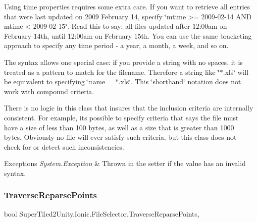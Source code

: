 Using time properties requires some extra care. If you want to retrieve all entries that were last updated on 2009 February 14, specify \char`\"{}mtime >= 2009-\/02-\/14 A\+N\+D mtime < 2009-\/02-\/15\char`\"{}. Read this to say\+: all files updated after 12\+:00am on February 14th, until 12\+:00am on February 15th. You can use the same bracketing approach to specify any time period -\/ a year, a month, a week, and so on. 

The syntax allows one special case\+: if you provide a string with no spaces, it is treated as a pattern to match for the filename. Therefore a string like \char`\"{}$\ast$.\+xls\char`\"{} will be equivalent to specifying \char`\"{}name
  = $\ast$.\+xls\char`\"{}. This \char`\"{}shorthand\char`\"{} notation does not work with compound criteria. 

There is no logic in this class that insures that the inclusion criteria are internally consistent. For example, it\textquotesingle{}s possible to specify criteria that says the file must have a size of less than 100 bytes, as well as a size that is greater than 1000 bytes. Obviously no file will ever satisfy such criteria, but this class does not check for or detect such inconsistencies. 


\begin{DoxyExceptions}{Exceptions}
{\em System.\+Exception} & Thrown in the setter if the value has an invalid syntax. \\
\hline
\end{DoxyExceptions}
\mbox{\label{class_super_tiled2_unity_1_1_ionic_1_1_file_selector_a631a7673d40a3ab092958c3d522d831d}} 
\subsubsection{\texorpdfstring{Traverse\+Reparse\+Points}{TraverseReparsePoints}}
{\footnotesize\ttfamily bool Super\+Tiled2\+Unity.\+Ionic.\+File\+Selector.\+Traverse\+Reparse\+Points\hspace{0.3cm}{\ttfamily [get]}, {\ttfamily [set]}}



